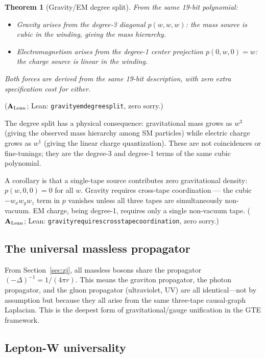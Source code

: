 \documentclass[11pt]{article}
\newtheorem{theorem}{Theorem}[section]
\theoremstyle{remark}
\newcommand{\lean}[1]{%
  \penalty-100
  \begingroup\def\_{\textunderscore\allowbreak}\texttt{#1}\endgroup}
\newcommand{\CatAL}{\ensuremath{\textbf{A}_{\rm Lean}}}
\begin{document}
\begin{theorem}[Gravity/EM degree split]
From the same 19-bit polynomial:
\begin{itemize}[itemsep=2pt]
\item \emph{Gravity} arises from the degree-3 diagonal $p(w,w,w)$: the mass
      source is cubic in the winding, giving the mass hierarchy.
\item \emph{Electromagnetism} arises from the degree-1 center projection
      $p(0,w,0) = w$: the charge source is linear in the winding.
\end{itemize}
Both forces are derived from the same 19-bit description, with zero extra
specification cost for either.
\end{theorem}

($\CatAL$; Lean: \lean{gravity\_em\_degree\_split}, zero sorry.)

The degree split has a physical consequence: gravitational mass grows as $w^3$
(giving the observed mass hierarchy among SM particles) while electric charge
grows as $w^1$ (giving the linear charge quantization). These are not coincidences
or fine-tunings; they are the degree-3 and degree-1 terms of the same cubic polynomial.

A corollary is that a single-tape source contributes zero gravitational density:
$p(w,0,0)=0$ for all $w$.  Gravity requires cross-tape coordination --- the
cubic $-w_x w_y w_z$ term in $p$ vanishes unless all three tapes are simultaneously
non-vacuum. EM charge, being degree-1, requires only a single non-vacuum tape.
($\CatAL$; Lean: \lean{gravity\_requires\_cross\_tape\_coordination}, zero sorry.)

\subsection{The universal massless propagator}
\label{ssec:universal_prop}

From Section~\ref{sec:zj}, all massless bosons share the propagator
$(-\Delta)^{-1} = 1/(4\pi r)$. This means the graviton propagator, the photon
propagator, and the gluon propagator (ultraviolet, UV) are all identical---not by assumption
but because they all arise from the same three-tape causal-graph Laplacian.
This is the deepest form of gravitational/gauge unification in the GTE framework.

\subsection{Lepton-W universality}
\label{ssec:lw_univ2}
\end{document}
